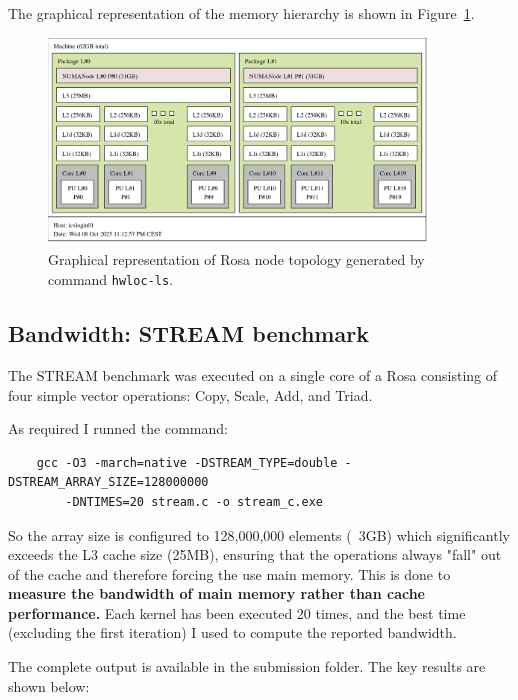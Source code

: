 The graphical representation of the memory hierarchy is shown in Figure~\ref{fig:memory_topology}.

\begin{figure}[h]
\centering
\includegraphics[width=0.9\textwidth]{../src/2-Performance-characteristics/02/XEON_E5-2650.png}
\caption{Graphical representation of Rosa node topology generated by command \texttt{hwloc-ls}.}
\label{fig:memory_topology}
\end{figure}


\subsection{Bandwidth: STREAM benchmark}
\label{subsec:stream}

The STREAM benchmark was executed on a single core of a Rosa consisting of four simple vector operations: Copy, Scale, Add, and Triad.

As required I runned the command:
\begin{verbatim}
    gcc -O3 -march=native -DSTREAM_TYPE=double -DSTREAM_ARRAY_SIZE=128000000 
        -DNTIMES=20 stream.c -o stream_c.exe
\end{verbatim}

So the array size is configured to 128,000,000 elements (~3GB) which significantly exceeds the L3 cache size (25MB), ensuring that the operations always "fall" out of the cache and therefore forcing the use main memory. This is done to \textbf{measure the bandwidth of main memory rather than cache performance.} Each kernel has been executed 20 times, and the best time (excluding the first iteration) I used to compute the reported bandwidth.

The complete output is available in the submission folder. The key results are shown below:



